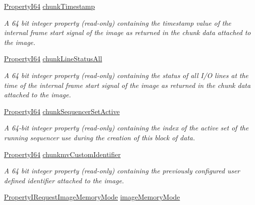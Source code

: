 \begin{DoxyCompactItemize}
\hyperlink{group___common_interface_ga81749b2696755513663492664a18a893}{Property\+I64} \hyperlink{classmv_i_m_p_a_c_t_1_1acquire_1_1_request_a72c1a18dd08d50deeb4117baf25225b2}{chunk\+Timestamp}
\begin{DoxyCompactList}\small\item\em A 64 bit integer property {\bfseries }(read-\/only) containing the timestamp value of the internal frame start signal of the image as returned in the chunk data attached to the image. \end{DoxyCompactList}\item 
\hyperlink{group___common_interface_ga81749b2696755513663492664a18a893}{Property\+I64} \hyperlink{classmv_i_m_p_a_c_t_1_1acquire_1_1_request_a659b5850f2db44b715b3d17af425c263}{chunk\+Line\+Status\+All}
\begin{DoxyCompactList}\small\item\em A 64 bit integer property {\bfseries }(read-\/only) containing the status of all I/\+O lines at the time of the internal frame start signal of the image as returned in the chunk data attached to the image. \end{DoxyCompactList}\item 
\hyperlink{group___common_interface_ga81749b2696755513663492664a18a893}{Property\+I64} \hyperlink{classmv_i_m_p_a_c_t_1_1acquire_1_1_request_aa66d08fd7e75d93657c403d6c697e656}{chunk\+Sequencer\+Set\+Active}
\begin{DoxyCompactList}\small\item\em A 64-\/bit integer property {\bfseries }(read-\/only) containing the index of the active set of the running sequencer use during the creation of this block of data. \end{DoxyCompactList}\item 
\hyperlink{group___common_interface_ga81749b2696755513663492664a18a893}{Property\+I64} \hyperlink{classmv_i_m_p_a_c_t_1_1acquire_1_1_request_a9d9f523d03a4ef82a5340f74ffc45934}{chunkmv\+Custom\+Identifier}
\begin{DoxyCompactList}\small\item\em A 64 bit integer property {\bfseries }(read-\/only) containing the previously configured user defined identifier attached to the image. \end{DoxyCompactList}\item 
\hyperlink{group___common_interface_ga9fb22f658031cb16ba91a7446462670f}{Property\+I\+Request\+Image\+Memory\+Mode} \hyperlink{classmv_i_m_p_a_c_t_1_1acquire_1_1_request_a05c7f2aad294449e1a9f6eb4a13597d4}{image\+Memory\+Mode}

\end{DoxyCompactItemize}
